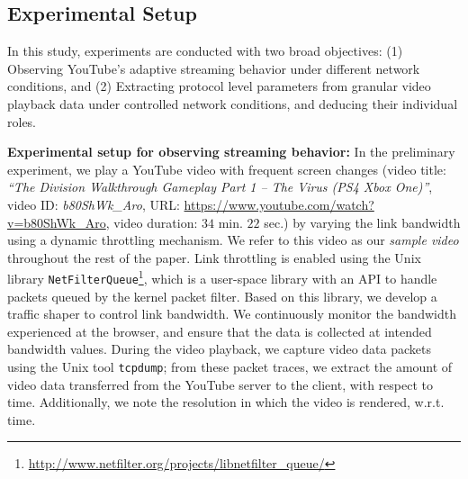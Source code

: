 \subsection{Experimental Setup}
\label{chap03s1:sec:experiments}

In this study, experiments are conducted with two broad objectives: (1) Observing YouTube's adaptive streaming behavior under different network conditions, and (2) Extracting protocol level parameters from granular video playback data under controlled network conditions, and deducing their individual roles.

{\bf Experimental setup for observing streaming behavior:} In the preliminary experiment, we play a YouTube video with frequent screen changes (video title: {\em ``The Division Walkthrough Gameplay Part 1 -- The Virus (PS4 Xbox One)''}, video ID: {\em b80ShWk\_Aro}, URL: \url{https://www.youtube.com/watch?v=b80ShWk_Aro}, video duration: $34$ min. $22$ sec.) by varying the link bandwidth using a dynamic throttling mechanism.
We refer to this video as our {\it sample video} throughout the rest of the paper.
Link throttling is enabled using the Unix library \texttt{NetFilterQueue}\footnote{\url{http://www.netfilter.org/projects/libnetfilter_queue/}}, which is a user-space library with an API to handle packets queued by the kernel packet filter.
Based on this library, we develop a traffic shaper to control link bandwidth.
We continuously monitor the bandwidth experienced at the browser, and ensure that the data is collected at intended bandwidth values.
During the video playback, we capture video data packets using the Unix tool \texttt{tcpdump}; from these packet traces, we extract the amount of video data transferred from the YouTube server to the client, with respect to time.
Additionally, we note the resolution in which the video is rendered, w.r.t. time.

